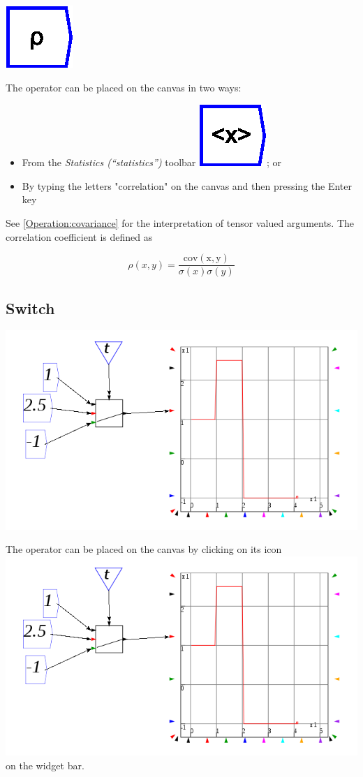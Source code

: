 \label{Operation:rho}

\includegraphics{images/rhoCorrelationCoefficient}

The operator can be placed on the canvas in two ways:
\begin{itemize}
\item From the \emph{Statistics (``statistics'')} toolbar \includegraphics{images/mean};
or 
\item By typing the letters "correlation" on the canvas and then pressing
the Enter key
\end{itemize}
See \ref{Operation:covariance} for the interpretation of tensor valued
arguments. The correlation coefficient is defined as

\[
\rho(x,y)=\frac{\mathrm{cov(x,y)}}{\sigma(x)\sigma(y)}
\]


\subsection{Switch}

\label{SwitchIcon}

\includegraphics{images/switch}

The operator can be placed on the canvas by clicking on its icon \includegraphics{images/switch}on
the widget bar.

